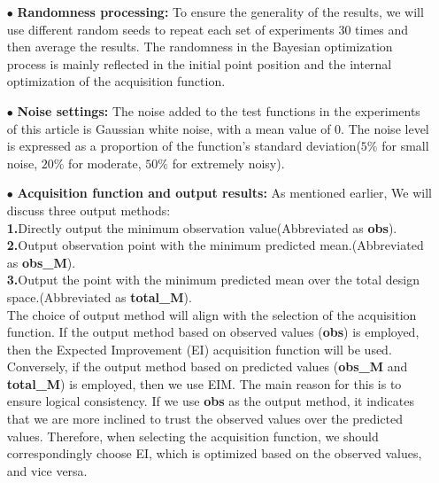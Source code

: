 \documentclass{article}
\begin{document}
\begin{itemize}[itemsep=4pt,topsep=0pt,parsep=0pt]
\item[$\bullet$] \textbf{Randomness processing:} To ensure the generality of the results, we will use different random seeds to repeat each set of experiments 30 times and then average the results. The randomness in the Bayesian optimization process is mainly reflected in the initial point position and the internal optimization of the acquisition function.
\item[$\bullet$] \textbf{Noise settings:} The noise added to the test functions in the experiments of this article is Gaussian white noise, with a mean value of 0. The noise level is expressed as a proportion of the function's standard deviation($5\%$ for small noise, $20\%$ for moderate, $50\%$ for extremely noisy).
\item[$\bullet$] \textbf{Acquisition function and output results:} As mentioned earlier, We will discuss three output methods: \\
\textbf{1.}Directly output the minimum observation value(Abbreviated as \textbf{obs}).\\
\textbf{2.}Output observation point with the minimum predicted mean.(Abbreviated as \textbf{obs\_M}).\\
\textbf{3.}Output the point with the minimum predicted mean over the total design space.(Abbreviated as \textbf{total\_M}).\\
The choice of output method will align with the selection of the acquisition function. If the output method based on observed values (\textbf{obs}) is employed, then the Expected Improvement (EI) acquisition function will be used. Conversely, if the output method based on predicted values (\textbf{obs\_M} and \textbf{total\_M}) is employed, then we use EIM. The main reason for this is to ensure logical consistency. If we use \textbf{obs} as the output method, it indicates that we are more inclined to trust the observed values over the predicted values. Therefore, when selecting the acquisition function, we should correspondingly choose EI, which is optimized based on the observed values, and vice versa.

\end{itemize}
\end{document}
